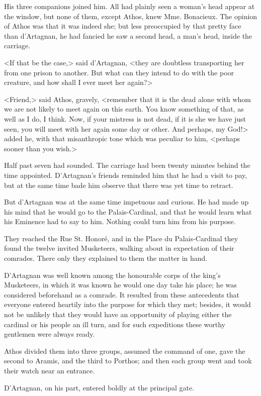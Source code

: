 His three companions joined him. All had plainly seen a woman's head appear at the window, but none of them, except Athos, knew Mme. Bonacieux. The opinion of Athos was that it was indeed she; but less preoccupied by that pretty face than d'Artagnan, he had fancied he saw a second head, a man's head, inside the carriage. 

<If that be the case,> said d'Artagnan, <they are doubtless transporting her from one prison to another. But what can they intend to do with the poor creature, and how shall I ever meet her again?> 

<Friend,> said Athos, gravely, <remember that it is the dead alone with whom we are not likely to meet again on this earth. You know something of that, as well as I do, I think. Now, if your mistress is not dead, if it is she we have just seen, you will meet with her again some day or other. And perhaps, my God!> added he, with that misanthropic tone which was peculiar to him, <perhaps sooner than you wish.> 

Half past seven had sounded. The carriage had been twenty minutes behind the time appointed. D'Artagnan's friends reminded him that he had a visit to pay, but at the same time bade him observe that there was yet time to retract. 

But d'Artagnan was at the same time impetuous and curious. He had made up his mind that he would go to the Palais-Cardinal, and that he would learn what his Eminence had to say to him. Nothing could turn him from his purpose. 

They reached the Rue St. Honoré, and in the Place du Palais-Cardinal they found the twelve invited Musketeers, walking about in expectation of their comrades. There only they explained to them the matter in hand. 

D'Artagnan was well known among the honourable corps of the king's Musketeers, in which it was known he would one day take his place; he was considered beforehand as a comrade. It resulted from these antecedents that everyone entered heartily into the purpose for which they met; besides, it would not be unlikely that they would have an opportunity of playing either the cardinal or his people an ill turn, and for such expeditions these worthy gentlemen were always ready. 

Athos divided them into three groups, assumed the command of one, gave the second to Aramis, and the third to Porthos; and then each group went and took their watch near an entrance. 

D'Artagnan, on his part, entered boldly at the principal gate. 

